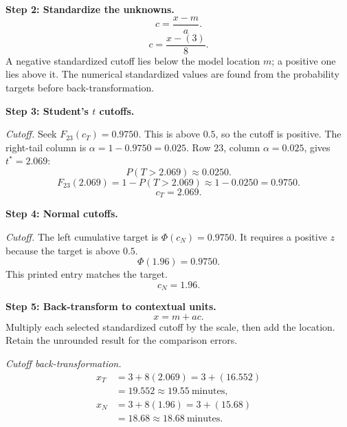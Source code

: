 \begin{enumerate}[leftmargin=*,label=\textbf{\arabic*.},itemsep=12pt,parsep=3pt,topsep=5pt]
\begin{minipage}[t]{\linewidth}
\end{minipage}\par
\par\noindent\begin{minipage}{\linewidth}
\par\textbf{Step 2: Standardize the unknowns.}\nopagebreak\enspace \[
c=\frac{x-m}{a}.
\]
\[
c=\frac{x-(3)}{8}.
\]
A negative standardized cutoff lies below the model location $m$; a positive one lies above it. The numerical standardized values are found from the probability targets before back-transformation.
\end{minipage}\par
\par\noindent\begin{minipage}{\linewidth}
\par\textbf{Step 3: Student's $t$ cutoffs.}\nopagebreak\enspace \par\textit{Cutoff.} Seek $F_{23}(c_{T})=0.9750$. This is above $0.5$, so the cutoff is positive. The right-tail column is $\alpha=1-0.9750=0.025$. Row $23$, column $\alpha=0.025$, gives $t^*=2.069$:\[
P(T>2.069)\approx0.0250.
\]
\[
F_{23}(2.069)=1-P(T>2.069)\approx1-0.0250=0.9750.
\]
\[
c_{T}=2.069.
\]

\end{minipage}\par
\par\textbf{Step 4: Normal cutoffs.}\nopagebreak\enspace \par\noindent\begin{minipage}{\linewidth}
\par\textit{Cutoff.} The left cumulative target is $\Phi(c_{N})=0.9750$. It requires a positive $z$ because the target is above $0.5$.\[
\Phi(1.96)=0.9750.
\]
This printed entry matches the target.\[
c_{N}=1.96.
\]
\end{minipage}\par

\par\noindent\begin{minipage}{\linewidth}
\par\textbf{Step 5: Back-transform to contextual units.}\nopagebreak\enspace \[
x=m+ac.
\]
Multiply each selected standardized cutoff by the scale, then add the location. Retain the unrounded result for the comparison errors.
\par\textit{Cutoff back-transformation.}
\[
\begin{aligned}x_T&=3+8(2.069)=3+(16.552)\\&=19.552\approx\boxed{19.55\ \text{minutes}},\\x_N&=3+8(1.96)=3+(15.68)\\&=18.68\approx\boxed{18.68\ \text{minutes}}.\end{aligned}
\]


\end{minipage}
\end{enumerate}
